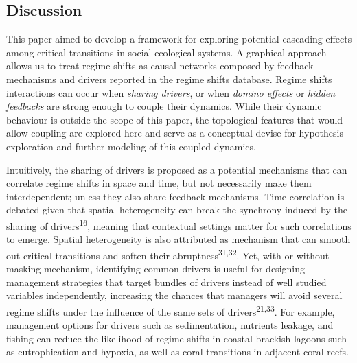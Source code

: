 \documentclass[9pt,]{article}
\begin{document}
\subsection{Discussion}\label{discussion}

This paper aimed to develop a framework for exploring potential
cascading effects among critical transitions in social-ecological
systems. A graphical approach allows us to treat regime shifts as causal
networks composed by feedback mechanisms and drivers reported in the
regime shifts database. Regime shifts interactions can occur when
\emph{sharing drivers}, or when \emph{domino effects} or \emph{hidden
feedbacks} are strong enough to couple their dynamics. While their
dynamic behaviour is outside the scope of this paper, the topological
features that would allow coupling are explored here and serve as a
conceptual devise for hypothesis exploration and further modeling of
this coupled dynamics.

Intuitively, the sharing of drivers is proposed as a potential
mechanisms that can correlate regime shifts in space and time, but not
necessarily make them interdependent; unless they also share feedback
mechanisms. Time correlation is debated given that spatial heterogeneity
can break the synchrony induced by the sharing of
drivers\textsuperscript{16}, meaning that contextual settings matter for
such correlations to emerge. Spatial heterogeneity is also attributed as
mechanism that can smooth out critical transitions and soften their
abruptness\textsuperscript{31,32}. Yet, with or without masking
mechanism, identifying common drivers is useful for designing management
strategies that target bundles of drivers instead of well studied
variables independently, increasing the chances that managers will avoid
several regime shifts under the influence of the same sets of
drivers\textsuperscript{21,33}. For example, management options for
drivers such as sedimentation, nutrients leakage, and fishing can reduce
the likelihood of regime shifts in coastal brackish lagoons such as
eutrophication and hypoxia, as well as coral transitions in adjacent
coral reefs.
\end{document}
